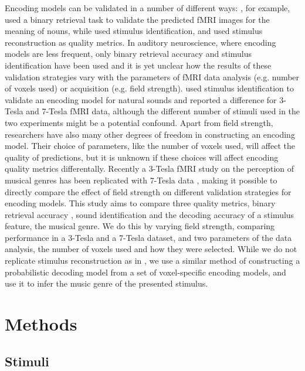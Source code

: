 Encoding models can be validated in a number of different ways: \citet{ML08},
for example, used a binary retrieval task to validate the predicted f{MRI}
images for the meaning of nouns, while \citet{KG+08} used stimulus
identification, and \citet{NG09} used stimulus reconstruction
as quality metrics.  In auditory neuroscience, where encoding models are less
frequent, only binary retrieval accuracy \citep{CTK+2012} and stimulus
identification \citep{SF14} have been used and it is yet unclear how the
results of these validation strategies vary with the parameters of f{MRI} data
analysis (e.g. number of voxels used)  or acquisition (e.g. field strength).
\citet{SF14} used stimulus identification to validate an encoding model for
natural sounds and reported a difference for 3-Tesla and 7-Tesla f{MRI} data,
although the different number of stimuli used in the two experiments might be a
potential confound.  Apart from field strength, researchers have also many
other degrees of freedom in constructing an encoding model.  Their choice of
parameters, like the number of voxels used, will affect the quality of
predictions, but it is unknown if these choices will affect encoding quality
metrics differentally.  Recently a 3-Tesla f{MRI} study on the perception of
musical genres \citep{CTK+2012} has been replicated with 7-Tesla data
\citep{HDH+2015}, making it possible to directly compare the effect of field
strength on different validation strategies for encoding models.  This study
aims to compare three quality metrics, binary retrieval accuracy \citep{ML08},
sound identification \citep{KG+08,SF14} and the decoding accuracy of a stimulus
feature, the musical genre. We do this by varying field strength, comparing
performance in a 3-Tesla and a 7-Tesla dataset, and two parameters of the data
analysis, the number of voxels used and how they were selected.  While we do
not replicate stimulus reconstruction as in \citep{NG09}, we use a similar
method of constructing a probabilistic decoding model from a set of
voxel-specific encoding models, and use it to infer the music genre of the
presented stimulus.


\section*{Methods}

\subsection*{Stimuli}

